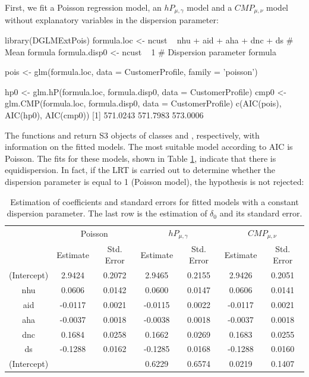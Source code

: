 First, we fit a Poisson regression model, an $hP_{\mu, \gamma}$ model and a $CMP_{\mu, \nu}$ model without explanatory variables in the dispersion parameter:

\begin{example}
library(DGLMExtPois)
formula.loc   <- ncust ~ nhu + aid + aha + dnc + ds # Mean formula
formula.disp0 <- ncust ~ 1                          # Dispersion parameter formula

pois <- glm(formula.loc, data = CustomerProfile, family = 'poisson')

hp0  <- glm.hP(formula.loc, formula.disp0, data = CustomerProfile)
cmp0 <- glm.CMP(formula.loc, formula.disp0, data = CustomerProfile)
c(AIC(pois), AIC(hp0), AIC(cmp0))
[1] 571.0243 571.7983 573.0006
\end{example}

The functions  and  return S3 objects of classes  and , respectively, with information on the fitted models. The most suitable model according to AIC is Poisson. The fits for these models, shown in Table \ref{tab_constant_dispersion}, indicate that there is equidispersion. In fact, if the LRT is carried out to determine whether the dispersion parameter is equal to 1 (Poisson model), the hypothesis is not rejected:

\begin{table}
    \centering
    \begin{tabular}{@{}ccccccc@{}}
    \toprule
    & \multicolumn{2}{c}{Poisson} & \multicolumn{2}{c}{$hP_{\mu, \gamma}$} & \multicolumn{2}{c}{$CMP_{\mu, \nu}$} \\     \cmidrule{2-7}
    &            Estimate & Std. Error  &  Estimate & Std. Error & Estimate & Std. Error \\ \midrule
(Intercept) & 2.9424 & 0.2072 & 2.9465 & 0.2155 & 2.9426 & 0.2051 \\
nhu         & 0.0606 & 0.0142 & 0.0600 & 0.0147 & 0.0606 & 0.0141 \\
aid         &-0.0117 & 0.0021 &-0.0115 & 0.0022 &-0.0117 & 0.0021 \\
aha         &-0.0037 & 0.0018 &-0.0038 & 0.0018 &-0.0037 & 0.0018 \\
dnc         & 0.1684 & 0.0258 & 0.1662 & 0.0269 & 0.1683 & 0.0255 \\
ds          &-0.1288 & 0.0162 &-0.1285 & 0.0168 &-0.1288 & 0.0160 \\ \midrule
(Intercept) &        &        & 0.6229 & 0.6574 & 0.0219 & 0.1407 \\ \bottomrule
    \end{tabular}
    \caption{Estimation of coefficients and standard errors for fitted models with a constant dispersion parameter. The last row is the estimation of $\delta_0$ and its standard error.}
    \label{tab_constant_dispersion}
\end{table}

